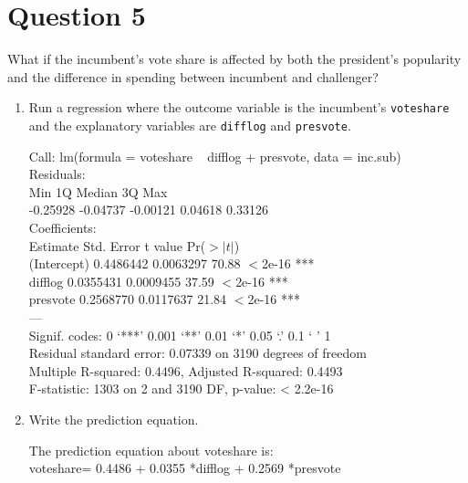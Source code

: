\documentclass[12pt,letterpaper]{article}
\begin{document}
\section*{Question 5}
\noindent What if the incumbent's vote share is affected by both the president's popularity and the difference in spending between incumbent and challenger? 
	\begin{enumerate}
		\item Run a regression where the outcome variable is the incumbent's \texttt{voteshare} and the explanatory variables are \texttt{difflog} and \texttt{presvote}.
		
		\vspace{.15cm}
		 
		\vspace{.15cm}
		Call:
		lm(formula = voteshare ~ difflog + presvote, data = inc.sub)\\
		
		Residuals:\\
		Min       1Q   Median       3Q      Max \\
		-0.25928 -0.04737 -0.00121  0.04618  0.33126 \\
		
		Coefficients:\\
		Estimate Std. Error t value Pr($>|t|$) \\   
		(Intercept) 0.4486442  0.0063297   70.88   $<$2e-16 ***\\
		difflog     0.0355431  0.0009455   37.59   $<$2e-16 ***\\
		presvote    0.2568770  0.0117637   21.84   $<$2e-16 ***\\
		---\\
		Signif. codes:  0 ‘***’ 0.001 ‘**’ 0.01 ‘*’ 0.05 ‘.’ 0.1 ‘ ’ 1\\
		
		Residual standard error: 0.07339 on 3190 degrees of freedom\\
		Multiple R-squared:  0.4496,	Adjusted R-squared:  0.4493\\ 
		F-statistic:  1303 on 2 and 3190 DF,  p-value: < 2.2e-16\\
		\item Write the prediction equation.	
		\vspace{.15cm}
		 
		\vspace{.15cm}
		The prediction equation about voteshare is:\\
		voteshare= 0.4486 + 0.0355 *difflog + 0.2569 *presvote\\
		

\end{enumerate}
\end{document}
